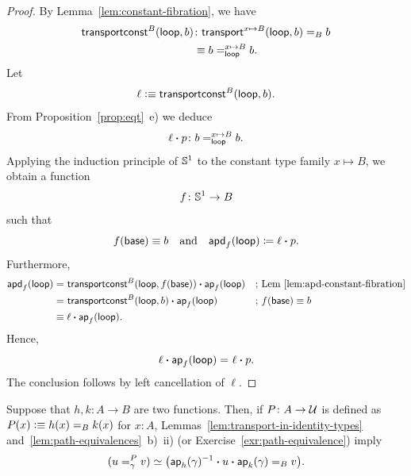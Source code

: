 \begin{proof}
    By Lemma~\ref{lem:constant-fibration}, we have
    \begin{align*}
        \fun{transportconst}^B(\fun{loop},b)
            &\colon
                \fun{transport}^{x\mapsto B}(\fun{loop},b)
                    \eq Bb\\
            &\equiv b\eqt{\fun{loop}}{x\mapsto B}b.
    \end{align*}
    Let
    \[
        \ell\mathrel{\vcentcolon}\equiv\mathsf{transportconst}^B(\mathsf{loop},b).
    \]
    From Proposition~\ref{prop:eqt}~e) we deduce
    \[
        \ell\ct p\colon
            b\eqt{\fun{loop}}{x\mapsto B}b.
    \]
    Applying the induction principle of $\mathbb S^1$ to the constant type family $x\mapsto B$, we obtain a function
    \[
        f\colon\sphere^1\to B
    \]
    such that
    \[
        f(\mathsf{base})\equiv b
        \quad\text{and}\quad
        \mathsf{apd}_f(\mathsf{loop})\coloneqq\ell\mathbin{\boldsymbol{\cdot}} p.
    \]
    Furthermore,
    \begin{align*}
        \mathsf{apd}_f(\mathsf{loop})
            &\mathrel{=_{}}
                \mathsf{transportconst}^B(
                        \mathsf{loop},
                        f(\mathsf{base})
                    )
                \mathbin{\boldsymbol{\cdot}}\mathsf{ap}_f(\mathsf{loop})
                &&\text{; Lem~\ref{lem:apd-constant-fibration}}\\
            &\mathrel{=_{}}
                \mathsf{transportconst}^B(\mathsf{loop},b)
                \mathbin{\boldsymbol{\cdot}}\mathsf{ap}_f(\mathsf{loop})
                &&\text{; }f(\mathsf{base})\equiv b\\
            &\equiv
                \ell\mathbin{\boldsymbol{\cdot}}\mathsf{ap}_f(\mathsf{loop}).
    \end{align*}
    Hence,
    \[
        \ell\mathbin{\boldsymbol{\cdot}}\mathsf{ap}_f(\mathsf{loop})\mathrel{=_{}}\ell\mathbin{\boldsymbol{\cdot}} p.
    \]
    The conclusion follows by left cancellation of $\ell$.
    
\end{proof}

\begin{rem}\label{rem:eqt-h=k}
    Suppose that $h,k\colon A\to B$ are two functions. Then, if $P\colon A\to\univ$ is defined as $P(x)\mathrel{\vcentcolon}\equiv h(x)\mathrel{=_{B}}k(x)$ for $x\colon A$, Lemmas~\ref{lem:transport-in-identity-types} and~\ref{lem:path-equivalences}~b)~ii) (or Exercise~\ref{exr:path-equivalence}) imply
    \[
        (u=_{\gamma}^{P}v)\simeq
            \bigl(
                \mathsf{ap}_h(\gamma)^{-1}
                \mathbin{\boldsymbol{\cdot}} u
                \mathbin{\boldsymbol{\cdot}}\mathsf{ap}_k(\gamma)
                \mathrel{=_{B}}v
            \bigr).
    \]
\end{rem}

